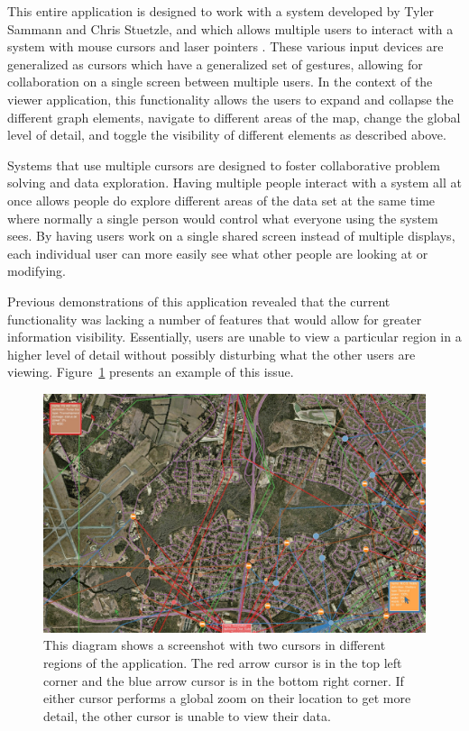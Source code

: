 This entire application is designed to work with a system developed by Tyler Sammann and Chris Stuetzle, and which allows multiple users to interact with a system with mouse cursors and laser pointers \cite{Sammann2013}. These various input devices are generalized as cursors which have a generalized set of gestures, allowing for collaboration on a single screen between multiple users. In the context of the viewer application, this functionality allows the users to expand and
collapse the different graph elements, navigate to different areas of the map, change the global level of detail, and toggle the visibility of different elements as described above.

Systems that use multiple cursors are designed to foster collaborative problem solving and data exploration. Having multiple people interact with a system all at once allows people do explore different areas of the data set at the same time where normally a single person would control what everyone using the system sees. By having users work on a single shared screen instead of multiple displays, each individual user can more easily see what other people are looking at or
modifying.

Previous demonstrations of this application revealed that the current functionality was lacking a number of features that would allow for greater information visibility. Essentially, users are unable to view a particular region in a higher level of detail without possibly disturbing what the other users are viewing. Figure~\ref{fig:example_problem} presents an example of this issue.

\begin{figure}[htp] \centering
    \includegraphics[width=150mm]{img/global_zoom_problem.jpg}
    \caption[Loss of Context]{This diagram shows a screenshot with two cursors in different regions of the application. The red arrow cursor is in the top left corner and the blue arrow cursor is in the bottom right corner. If either cursor performs a global zoom on their location to get more detail, the other cursor is unable to view their data.}
    \label{fig:example_problem}
\end{figure}

